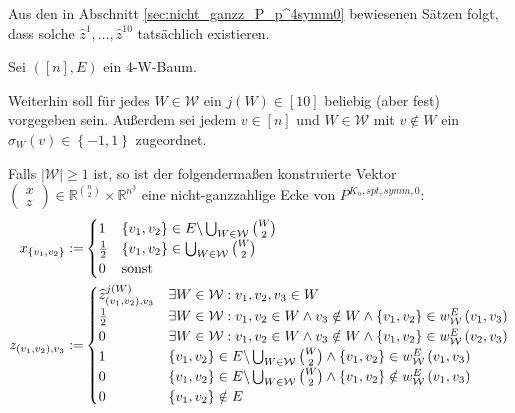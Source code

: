 \documentclass[10p,a4paper,BCOR = 12mm, DIV=15]{scrbook}
\begin{document}
Aus den in Abschnitt \ref{sec:nicht_ganzz_P_p^4symm0} bewiesenen Sätzen folgt, dass solche $\widehat{z}^1, \ldots, \widehat{z}^{10}$ tatsächlich existieren.

\begin{Sa}
Sei $\left(\left[n\right], E\right)$ ein 4-W-Baum.

Weiterhin soll für jedes $W \in \mathcal{W}$ ein $j\left(W\right) \in\left[10\right]$ beliebig (aber fest) vorgegeben sein. Außerdem sei jedem $v \in \left[n\right]$ und $W \in \mathcal{W}$ mit $v \notin W$ ein $\sigma_{W}\left(v\right) \in \left\{-1, 1\right\}$ zugeordnet. 

Falls $\left|\mathcal{W}\right| \geq 1$ ist, so ist der folgendermaßen konstruierte Vektor $\left(
\begin{array}{c}
x \\
z
\end{array}
\right) \in \mathbb{R}^{n \choose 2} \times \mathbb{R}^{n^{\underline{3}}}$ eine nicht-ganzzahlige Ecke von $P^{K_n, spt, symm, 0}$:
{
\allowdisplaybreaks
\begin{align*}
x_{\left\{v_1, v_2\right\}} := & \begin{cases}
1 & \left\{v_1, v_2\right\} \in E \backslash \bigcup_{W \in \mathcal{W}} {W \choose 2} \\
\frac{1}{2} & \left\{v_1, v_2\right\} \in \bigcup_{W \in \mathcal{W}} {W \choose 2} \\
0 & \textnormal{sonst}
\end{cases} \\
z_{\left(v_1, v_2\right), v_3} := & \begin{cases}
\widehat{z}^{j\left(W\right)}_{\left(v_1, v_2\right), v_3} & \exists W \in \mathcal{W}: v_1, v_2, v_3 \in W \\
\frac{1}{2} & \exists W \in \mathcal{W}: v_1, v_2\in W \wedge v_3 \notin W \wedge \left\{v_1, v_2\right\} \in w_{\mathcal{W}}^E\left(v_1, v_3\right) \\
0 & \exists W \in \mathcal{W}: v_1, v_2\in W \wedge v_3 \notin W \wedge \left\{v_1, v_2\right\} \in w_{\mathcal{W}}^E\left(v_2, v_3\right) \\
1 & \left\{v_1, v_2\right\} \in E \backslash \bigcup_{W \in \mathcal{W}} {W \choose 2} \wedge \left\{v_1, v_2\right\} \in w_{\mathcal{W}}^E\left(v_1, v_3\right) \\
0 & \left\{v_1, v_2\right\} \in E \backslash \bigcup_{W \in \mathcal{W}} {W \choose 2} \wedge \left\{v_1, v_2\right\} \notin w_{\mathcal{W}}^E\left(v_1, v_3\right) \\
0 & \left\{v_1, v_2\right\} \notin E
\end{cases}
\end{align*}
}


\end{Sa}
\end{document}
